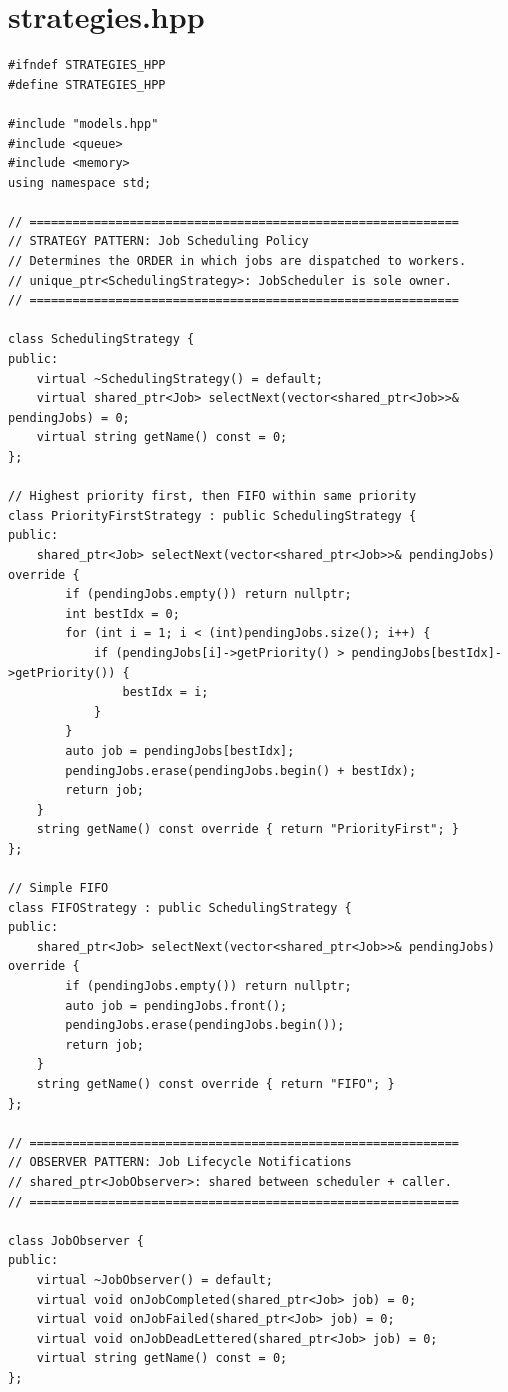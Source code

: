 \documentclass[11pt,a4paper]{article}
\begin{document}
\section{strategies.hpp}
\begin{lstlisting}[title={\texttt{strategies.hpp}}]
#ifndef STRATEGIES_HPP
#define STRATEGIES_HPP

#include "models.hpp"
#include <queue>
#include <memory>
using namespace std;

// ============================================================
// STRATEGY PATTERN: Job Scheduling Policy
// Determines the ORDER in which jobs are dispatched to workers.
// unique_ptr<SchedulingStrategy>: JobScheduler is sole owner.
// ============================================================

class SchedulingStrategy {
public:
    virtual ~SchedulingStrategy() = default;
    virtual shared_ptr<Job> selectNext(vector<shared_ptr<Job>>& pendingJobs) = 0;
    virtual string getName() const = 0;
};

// Highest priority first, then FIFO within same priority
class PriorityFirstStrategy : public SchedulingStrategy {
public:
    shared_ptr<Job> selectNext(vector<shared_ptr<Job>>& pendingJobs) override {
        if (pendingJobs.empty()) return nullptr;
        int bestIdx = 0;
        for (int i = 1; i < (int)pendingJobs.size(); i++) {
            if (pendingJobs[i]->getPriority() > pendingJobs[bestIdx]->getPriority()) {
                bestIdx = i;
            }
        }
        auto job = pendingJobs[bestIdx];
        pendingJobs.erase(pendingJobs.begin() + bestIdx);
        return job;
    }
    string getName() const override { return "PriorityFirst"; }
};

// Simple FIFO
class FIFOStrategy : public SchedulingStrategy {
public:
    shared_ptr<Job> selectNext(vector<shared_ptr<Job>>& pendingJobs) override {
        if (pendingJobs.empty()) return nullptr;
        auto job = pendingJobs.front();
        pendingJobs.erase(pendingJobs.begin());
        return job;
    }
    string getName() const override { return "FIFO"; }
};

// ============================================================
// OBSERVER PATTERN: Job Lifecycle Notifications
// shared_ptr<JobObserver>: shared between scheduler + caller.
// ============================================================

class JobObserver {
public:
    virtual ~JobObserver() = default;
    virtual void onJobCompleted(shared_ptr<Job> job) = 0;
    virtual void onJobFailed(shared_ptr<Job> job) = 0;
    virtual void onJobDeadLettered(shared_ptr<Job> job) = 0;
    virtual string getName() const = 0;
};


\end{lstlisting}
\end{document}
